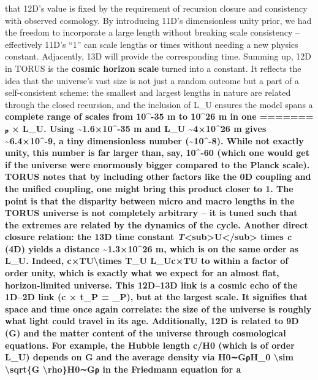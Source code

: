 \documentclass[]{article}
\begin{document}
that 12D's value is fixed by the requirement of recursion closure and
consistency with observed cosmology\hspace{0pt}. By introducing 11D's
dimensionless unity prior, we had the freedom to incorporate a large
length without breaking scale consistency -- effectively 11D's ``1'' can
scale lengths or times without needing a new physics
constant\hspace{0pt}. Adjacently, 13D will provide the corresponding
time. Summing up, 12D in TORUS is the \textbf{cosmic horizon scale}
turned into a constant. It reflects the idea that the universe's vast
size is not just a random outcome but a part of a self-consistent
scheme: the smallest and largest lengths in nature are related through
the closed recursion, and the inclusion of L\_U ensures the model spans
a \textbf{complete range of scales from 10\^{}-35 m to 10\^{}26 m in one
=======
\emph{\ell}ₚ × L\_U. Using  \textasciitilde{}1.6×10\^{}-35 m and L\_U
\textasciitilde{}4×10\^{}26 m gives \textasciitilde{}6.4×10\^{}-9, a
tiny dimensionless number (\textasciitilde{}10\^{}-8)​. While not
exactly unity, this number is far larger than, say, 10\^{}-60 (which one
would get if the universe were enormously bigger compared to the Planck
scale). TORUS notes that by including other factors like the 0D coupling
and the unified coupling, one might bring this product closer to 1​. The
point is that the \textbf{disparity between micro and macro lengths} in
the TORUS universe is not completely arbitrary -- it is tuned such that
the extremes are related by the dynamics of the cycle​. Another direct
closure relation: the 13D time constant
\emph{T}\textless{}sub\textgreater{}U\textless{}/sub\textgreater{} times
\emph{c} (4D) yields a distance \textasciitilde{}1.3×10\^{}26 m, which
is on the same order as L\_U​. Indeed, c×TU\approxLUc \textbackslash{}times
T\_U \approx L\_Uc×TU​\approxLU​ to within a factor of order unity, which is exactly
what we expect for an almost flat, horizon-limited universe. This
12D--13D link is a \textbf{cosmic echo} of the 1D--2D link (c × t\_P =
\ell\_P), but at the largest scale​. It signifies that space and time once
again correlate: the size of the universe is roughly what light could
travel in its age. Additionally, 12D is related to 9D (G) and the matter
content of the universe through cosmological equations. For example, the
Hubble length c/H0 (which is of order L\_U) depends on G and the average
density via H0∼GρH\_0 \textbackslash{}sim \textbackslash{}sqrt\{G
\textbackslash{}rho\}H0​∼Gρ​ in the Friedmann equation for a
}
\end{document}
